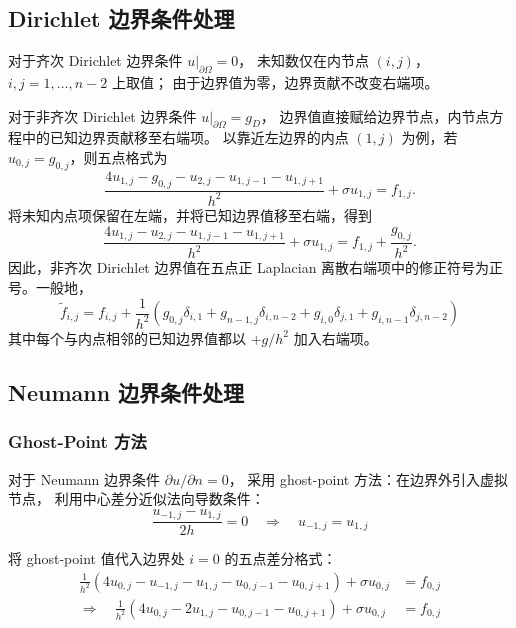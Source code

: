 \subsection{Dirichlet 边界条件处理}

对于齐次 Dirichlet 边界条件 $u|_{\partial\Omega} = 0$，
未知数仅在内节点 $(i,j)$，$i,j = 1, \ldots, n-2$ 上取值；
由于边界值为零，边界贡献不改变右端项。

对于非齐次 Dirichlet 边界条件 $u|_{\partial\Omega}=g_D$，
边界值直接赋给边界节点，内节点方程中的已知边界贡献移至右端项。
以靠近左边界的内点 $(1,j)$ 为例，若 $u_{0,j}=g_{0,j}$，则五点格式为
\[
\frac{4u_{1,j}-g_{0,j}-u_{2,j}-u_{1,j-1}-u_{1,j+1}}{h^2}
+\sigma u_{1,j}
=
f_{1,j}.
\]
将未知内点项保留在左端，并将已知边界值移至右端，得到
\[
\frac{4u_{1,j}-u_{2,j}-u_{1,j-1}-u_{1,j+1}}{h^2}
+\sigma u_{1,j}
=
f_{1,j}
+
\frac{g_{0,j}}{h^2}.
\]
因此，非齐次 Dirichlet 边界值在五点正 Laplacian 离散右端项中的修正符号为正号。一般地，
\begin{equation}
  \tilde{f}_{i,j} = f_{i,j} + \frac{1}{h^2}(g_{0,j}\delta_{i,1} + g_{n-1,j}\delta_{i,n-2}
  + g_{i,0}\delta_{j,1} + g_{i,n-1}\delta_{j,n-2})
  \label{eq:nonhom_dirichlet_rhs}
\end{equation}
其中每个与内点相邻的已知边界值都以 $+g/h^2$ 加入右端项。

\subsection{Neumann 边界条件处理}

\subsubsection{Ghost-Point 方法}

对于 Neumann 边界条件 $\partial u/\partial n = 0$，
采用 ghost-point 方法：在边界外引入虚拟节点，
利用中心差分近似法向导数条件：
\begin{equation}
  \frac{u_{-1,j} - u_{1,j}}{2h} = 0 \quad \Longrightarrow \quad u_{-1,j} = u_{1,j}
\end{equation}

将 ghost-point 值代入边界处 $i=0$ 的五点差分格式：
\begin{align}
  \frac{1}{h^2}(4u_{0,j} - u_{-1,j} - u_{1,j} - u_{0,j-1} - u_{0,j+1}) + \sigma u_{0,j} &= f_{0,j} \\
  \Longrightarrow \quad \frac{1}{h^2}(4u_{0,j} - 2u_{1,j} - u_{0,j-1} - u_{0,j+1}) + \sigma u_{0,j} &= f_{0,j}
\end{align}

